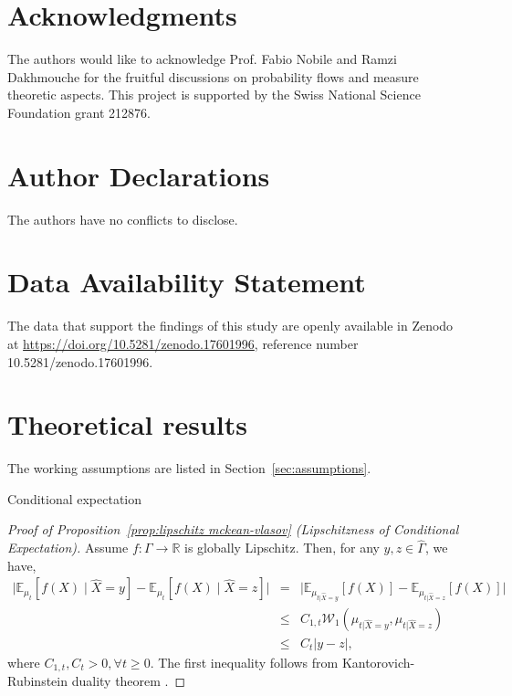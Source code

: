 \documentclass[11pt, a4paper, oneside, reqno]{amsart}
\makeatletter
\def\subsection{\@startsection{subsection}{2}%
	\z@{.5\linespacing\@plus.7\linespacing}{.5\linespacing}%
	{\normalfont\large\bfseries}}
\makeatother
\begin{document}
\section*{Acknowledgments}
    \noindent The authors would like to acknowledge Prof. Fabio Nobile and Ramzi Dakhmouche for the fruitful discussions on probability flows and measure theoretic aspects.
    This project is supported by the Swiss National Science Foundation grant 212876.
\section*{Author Declarations}
\noindent The authors have no conflicts to disclose.


\section*{Data Availability Statement}
\noindent The data that support the findings of this study are openly available in Zenodo at \url{https://doi.org/10.5281/zenodo.17601996}, reference number 10.5281/zenodo.17601996.

\appendix

\section{Theoretical results}\label{app:proofs}
\noindent The working assumptions are listed in Section~\ref{sec:assumptions}.

\subsection{Conditional expectation}\label{app:condexp}
\begin{proof}[Proof of Proposition~\ref{prop:lipschitz mckean-vlasov} (Lipschitzness of Conditional Expectation)]
    Assume $f:\Gamma\to\mathbb{R}$ is globally Lipschitz. Then, for any $y,z\in\hat{\Gamma}$, we have,
    \begin{eqnarray}
        \big| \mathbb{E}_{\mu_t}[f(X)\mid \hat{X}=y] -  \mathbb{E}_{\mu_t}[f(X)\mid \hat{X}=z]\big| &=& \big| \mathbb{E}_{\mu_{t|\hat{X}=y}}[f(X)] -  \mathbb{E}_{\mu_{t|\hat{X}=z}}[f(X)]\big| \nonumber\\
        &\leq& C_{1,t}\mathcal{W}_1(\mu_{t|\hat{X}=y},\mu_{t|\hat{X}=z})\nonumber\\
        &\leq &C_t|y-z|,
    \end{eqnarray}
    where $C_{1,t},C_t>0, \forall t\geq 0$. The first inequality follows from Kantorovich-Rubinstein duality theorem \cite{Villani2009}.
\end{proof}
\end{document}

